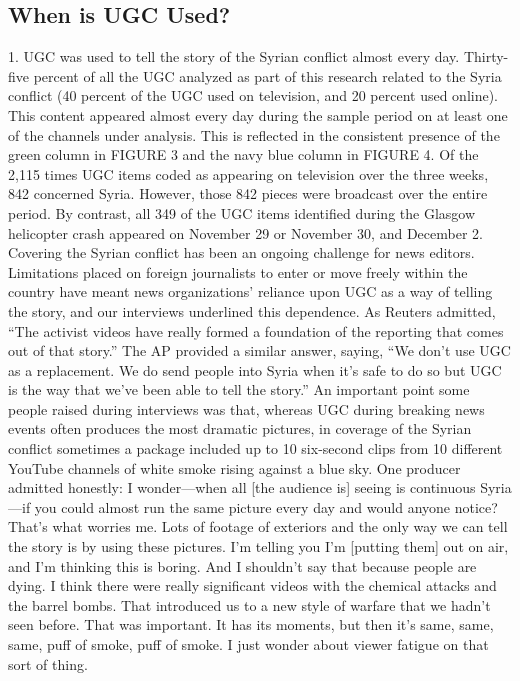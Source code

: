 \begin{enumerate}
\section{When is UGC Used?}
1. UGC was used to tell the story of the Syrian conflict almost
every day.
Thirty-five percent of all the UGC analyzed as part of this research related
to the Syria conflict (40 percent of the UGC used on television, and 20 percent
used online). This content appeared almost every day during the sample
period on at least one of the channels under analysis. This is reflected
in the consistent presence of the green column in FIGURE 3 and the navy
blue column in FIGURE 4. Of the 2,115 times UGC items coded as appearing on television over the three weeks, 842 concerned Syria. However, those
842 pieces were broadcast over the entire period. By contrast, all 349 of
the UGC items identified during the Glasgow helicopter crash appeared on
November 29 or November 30, and December 2.
Covering the Syrian conflict has been an ongoing challenge for news editors.
Limitations placed on foreign journalists to enter or move freely within
the country have meant news organizations' reliance upon UGC as a way of
telling the story, and our interviews underlined this dependence. As Reuters
admitted, ``The activist videos have really formed a foundation of the reporting
that comes out of that story.'' The AP provided a similar answer, saying,
``We don't use UGC as a replacement. We do send people into Syria when
it's safe to do so but UGC is the way that we've been able to tell the story.''
An important point some people raised during interviews was that, whereas
UGC during breaking news events often produces the most dramatic pictures,
in coverage of the Syrian conflict sometimes a package included up
to 10 six-second clips from 10 different YouTube channels of white smoke
rising against a blue sky. One producer admitted honestly:
I wonder—when all [the audience is] seeing is continuous Syria—if
you could almost run the same picture every day and would anyone
notice? That's what worries me. Lots of footage of exteriors and the
only way we can tell the story is by using these pictures. I'm telling
you I'm [putting them] out on air, and I'm thinking this is boring.
And I shouldn't say that because people are dying. I think there were
really significant videos with the chemical attacks and the barrel
bombs. That introduced us to a new style of warfare that we hadn't
seen before. That was important. It has its moments, but then it's
same, same, same, puff of smoke, puff of smoke. I just wonder about
viewer fatigue on that sort of thing.


\end{enumerate}
